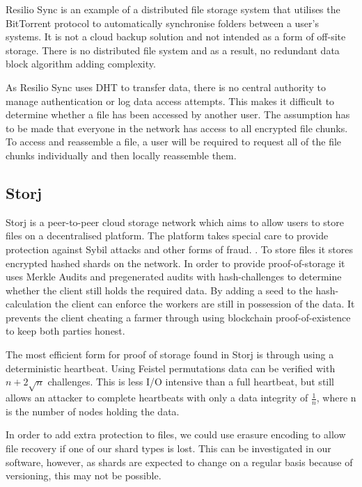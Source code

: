 \documentclass[11pt, a4paper, twoside]{report}
\begin{document}
Resilio Sync is an example of a distributed file storage system that utilises the BitTorrent protocol to automatically synchronise folders between a user’s systems. It is not a cloud backup solution and not intended as a form of off-site storage. There is no distributed file system and as a result, no redundant data block algorithm adding complexity. \citep{farina2014bittorrent}

As Resilio Sync uses DHT to transfer data, there is no central authority to manage authentication or log data access attempts. This makes it difficult to determine whether a file has been accessed by another user. \citep{farina2014bittorrent} The assumption has to be made that everyone in the network has access to all encrypted file chunks. To access and reassemble a file, a user will be required to request all of the file chunks individually and then locally reassemble them.

\subsection{Storj}

Storj is a peer-to-peer cloud storage network which aims to allow users to store files on a decentralised platform. The platform takes special care to provide protection against Sybil attacks and other forms of fraud. \citep{Wilkinson14storja}. To store files it stores encrypted hashed shards on the network. In order to provide proof-of-storage it uses Merkle Audits and pregenerated audits with hash-challenges to determine whether the client still holds the required data. By adding a seed to the hash-calculation the client can enforce the workers are still in possession of the data. It prevents the client cheating a farmer through using blockchain proof-of-existence to keep both parties honest.

The most efficient form for proof of storage found in Storj is through using a deterministic heartbeat. Using Feistel permutations data can be verified with $n + 2 \sqrt{n}$ challenges. This is less I/O intensive than a full heartbeat, but still allows an attacker to complete heartbeats with only a data integrity of $\frac{1}{n}$, where n is the number of nodes holding the data.

In order to add extra protection to files, we could use erasure encoding to allow file recovery if one of our shard types is lost. This can be investigated in our software, however, as shards are expected to change on a regular basis because of versioning, this may not be possible.
\end{document}
